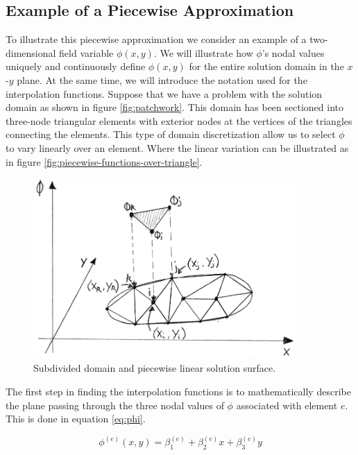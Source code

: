 \subsection{Example of a Piecewise Approximation}
\label{sec:piecewise-approximation}
To illustrate this piecewise approximation we consider
an example of a two-dimensional field variable $\phi(x,y)$.
We will illustrate how $\phi$'s nodal values uniquely and continuously
define $\phi(x,y)$ for the entire solution domain in the $x$-$y$
plane. At the same time, we will introduce the notation used for the
interpolation functions.
Suppose that we have a problem with the solution domain as shown in figure
\vref{fig:patchwork}. This domain has
been sectioned into
three-node triangular elements with exterior nodes at the vertices of
the triangles connecting the elements.
%
This type of domain discretization allow us to select $\phi$ to vary
linearly over an element. Where the linear variation can be
illustrated as in figure
\vref{fig:piecewise-functions-over-triangle}.

\begin{figure}
  \centering
  \includegraphics[width=10cm]{./images/finite_element_method_piecewise_functions_over_triangle.png}
\caption{Subdivided domain and piecewise linear solution surface.}
\label{fig:piecewise-functions-over-triangle}
\end{figure}

The first step in finding
the interpolation functions is to mathematically describe the plane passing
through the three nodal values of $\phi$ associated with element
$e$. This is done in equation \eqref{eq:phi}.

\begin{equation}
\label{eq:phi}
\phi^{(e)}(x,y) = \beta_1^{(e)} + \beta_2^{(e)} x + \beta_3^{(e)} y
\end{equation}

